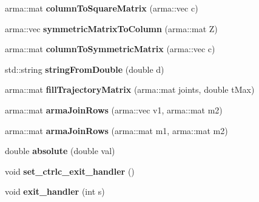 \begin{DoxyCompactItemize}
\item 
\hypertarget{namespacekukadu_a8d2e88a98c08cbfd87d18b1a3b4d1298}{arma\-::mat {\bfseries column\-To\-Square\-Matrix} (arma\-::vec c)}\label{namespacekukadu_a8d2e88a98c08cbfd87d18b1a3b4d1298}

\item 
\hypertarget{namespacekukadu_aca8d32e86c74fc56cbc550bd94f60d3d}{arma\-::vec {\bfseries symmetric\-Matrix\-To\-Column} (arma\-::mat Z)}\label{namespacekukadu_aca8d32e86c74fc56cbc550bd94f60d3d}

\item 
\hypertarget{namespacekukadu_a32697d90452b54037e5a425ba1ced6ff}{arma\-::mat {\bfseries column\-To\-Symmetric\-Matrix} (arma\-::vec c)}\label{namespacekukadu_a32697d90452b54037e5a425ba1ced6ff}

\item 
\hypertarget{namespacekukadu_af021770f184a52bcf84ff0941df261b9}{std\-::string {\bfseries string\-From\-Double} (double d)}\label{namespacekukadu_af021770f184a52bcf84ff0941df261b9}

\item 
\hypertarget{namespacekukadu_aa92edac0d1f170818da990b6f3f57bf4}{arma\-::mat {\bfseries fill\-Trajectory\-Matrix} (arma\-::mat joints, double t\-Max)}\label{namespacekukadu_aa92edac0d1f170818da990b6f3f57bf4}

\item 
\hypertarget{namespacekukadu_adfb0b5a62a292323b452e90d071da4ea}{arma\-::mat {\bfseries arma\-Join\-Rows} (arma\-::vec v1, arma\-::mat m2)}\label{namespacekukadu_adfb0b5a62a292323b452e90d071da4ea}

\item 
\hypertarget{namespacekukadu_a3fc360dd62f44f1ed05b93719cf25e51}{arma\-::mat {\bfseries arma\-Join\-Rows} (arma\-::mat m1, arma\-::mat m2)}\label{namespacekukadu_a3fc360dd62f44f1ed05b93719cf25e51}

\item 
\hypertarget{namespacekukadu_adf087f4f1f69f316365a414842f51512}{double {\bfseries absolute} (double val)}\label{namespacekukadu_adf087f4f1f69f316365a414842f51512}

\item 
\hypertarget{namespacekukadu_ad4e11f6abb484a595bba462ac88f9605}{void {\bfseries set\-\_\-ctrlc\-\_\-exit\-\_\-handler} ()}\label{namespacekukadu_ad4e11f6abb484a595bba462ac88f9605}

\item 
\hypertarget{namespacekukadu_a0f5a68a4b2aefd3d894a0235664ac5e5}{void {\bfseries exit\-\_\-handler} (int s)}\label{namespacekukadu_a0f5a68a4b2aefd3d894a0235664ac5e5}


\end{DoxyCompactItemize}
